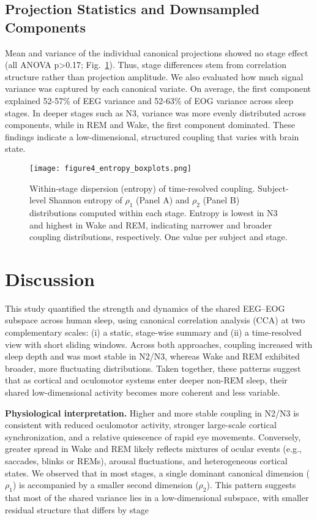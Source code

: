 \subsection{Projection Statistics and Downsampled Components}
\vspace{0pt}%
Mean and variance of the individual canonical projections showed no stage effect (all ANOVA p>0.17; Fig.~\ref{fig:figure4}). Thus, stage differences stem from correlation structure rather than projection amplitude.
We also evaluated how much signal variance was captured by each canonical variate. On average, the first component explained 52-57\% of EEG variance and 52-63\% of EOG variance across sleep stages. In deeper stages such as N3, variance was more evenly distributed across components, while in REM and Wake, the first component dominated. These findings indicate a low-dimensional, structured coupling that varies with brain state.%
\begin{figure}[!t]
\centering
\texttt{[image: figure4\_entropy\_boxplots.png]}%
\caption{Within-stage dispersion (entropy) of time-resolved coupling. Subject-level Shannon entropy of $\rho_1$ (Panel A) and $\rho_2$ (Panel B) distributions computed within each stage. Entropy is lowest in N3 and highest in Wake and REM, indicating narrower and broader coupling distributions, respectively. One value per subject and stage.}\label{fig:figure4}
\end{figure}%
\vspace{0pt}%

\section{Discussion}
This study quantified the strength and dynamics of the shared EEG--EOG subspace across human sleep, using canonical correlation analysis (CCA) at two complementary scales: (i) a static, stage-wise summary and (ii) a time-resolved view with short sliding windows. Across both approaches, coupling increased with sleep depth and was most stable in N2/N3, whereas Wake and REM exhibited broader, more fluctuating distributions. Taken together, these patterns suggest that as cortical and oculomotor systems enter deeper non-REM sleep, their shared low-dimensional activity becomes more coherent and less variable.

\textbf{Physiological interpretation.}
Higher and more stable coupling in N2/N3 is consistent with reduced oculomotor activity, stronger large-scale cortical synchronization, and a relative quiescence of rapid eye movements. Conversely, greater spread in Wake and REM likely reflects mixtures of ocular events (e.g., saccades, blinks or REMs), arousal fluctuations, and heterogeneous cortical states. We observed that in most stages, a single dominant canonical dimension ($\rho_1$) is accompanied by a smaller second dimension ($\rho_2$). This pattern suggests that most of the shared variance lies in a low-dimensional subspace, with smaller residual structure that differs by stage


